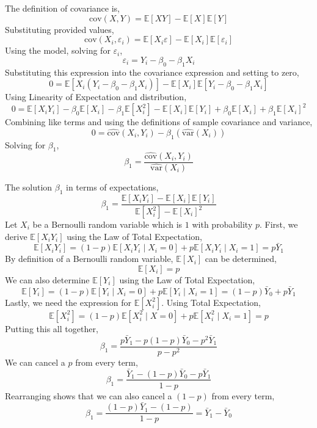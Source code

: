 \documentclass[12pt,twoside]{article}
\begin{document}
\begin{problems}
\problem  %

The definition of covariance is,
$$ \mathrm{cov}(X, Y) = \mathbb{E}[XY] - \mathbb{E}[X] \mathbb{E}[Y] $$
Substituting provided values,
$$ \mathrm{cov}(X_i, \varepsilon_i) = \mathbb{E}[X_i \varepsilon] - \mathbb{E}[X_i]
\mathbb{E}[\varepsilon_i] $$
Using the model, solving for $\varepsilon_i$,
$$ \varepsilon_i = Y_i - \beta_0 - \beta_1 X_i $$
Substituting this expression into the covariance expression and setting to zero,
$$ 0 = \mathbb{E}[X_i \left(Y_i - \beta_0 - \beta_1 X_i \right)] - \mathbb{E}[X_i]
\mathbb{E}[Y_i - \beta_0 - \beta_1 X_i] $$
Using Linearity of Expectation and distribution,
$$ 0 = \mathbb{E}[X_i Y_i] - \beta_0 \mathbb{E}[X_i] - \beta_1 \mathbb{E}[X_i^2] - 
\mathbb{E}[X_i] \mathbb{E}[Y_i] + \beta_0 \mathbb{E}[X_i] + \beta_1 \mathbb{E}[X_i]^2 $$
Combining like terms and using the definitions of sample covariance and variance,
$$ 0 = \hat{\mathrm{cov}}(X_i, Y_i) - \beta_1 \left(\hat{\mathrm{var}}(X_i)\right) $$
Solving for $\beta_1$,
$$ \boxed{\beta_1 = \frac{\hat{\mathrm{cov}}(X_i, Y_i)}{\hat{\mathrm{var}}(X_i)}} $$

\problem  %

The solution $\beta_1$ in terms of expectations,
$$ \beta_1 = \frac{\mathbb{E}[X_i Y_i] - \mathbb{E}[X_i] \mathbb{E}[Y_i]}
{\mathbb{E}[X_i^2] - \mathbb{E}[X_i]^2} $$
Let $X_i$ be a Bernoulli random variable which is $1$ with probability $p$. First,
we derive $\mathbb{E}[X_i Y_i]$ using the Law of Total Expectation,
$$ \mathbb{E}[X_i Y_i] = (1 - p) \mathbb{E}[X_i Y_i \mid X_i = 0] + p \mathbb{E}[X_i Y_i
\mid X_i = 1] = p \bar{Y}_1 $$
By definition of a Bernoulli random variable, $\mathbb{E}[X_i]$ can be determined,
$$ \mathbb{E}[X_i] = p $$
We can also determine $\mathbb{E}[Y_i]$ using the Law of Total Expectation,
$$ \mathbb{E}[Y_i] = (1 - p) \mathbb{E}[Y_i \mid X_i = 0] + p \mathbb{E}[Y_i
\mid X_i = 1] = (1 - p) \bar{Y}_0 + p \bar{Y}_1 $$
Lastly, we need the expression for $\mathbb{E}[X_i^2]$. Using Total Expectation,
$$ \mathbb{E}[X_i^2] = (1 - p) \mathbb{E}[X_i^2 \mid X = 0] + p \mathbb{E}[X_i^2 \mid 
X_i = 1] = p $$
Putting this all together,
$$ \beta_1 = \frac{p \bar{Y}_1 - p (1 - p) \bar{Y}_0 - p^2 \bar{Y}_1}{p - p^2} $$
We can cancel a $p$ from every term,
$$ \beta_1 = \frac{\bar{Y}_1 - (1 - p) \bar{Y}_0 - p \bar{Y}_1}{1 - p} $$
Rearranging shows that we can also cancel a $(1 - p)$ from every term,
$$ \beta_1 = \frac{(1 - p) \bar{Y}_1 - (1 - p)}{1 - p} = \boxed{\bar{Y}_1 - \bar{Y}_0} $$

\newpage


\end{problems}
\end{document}
